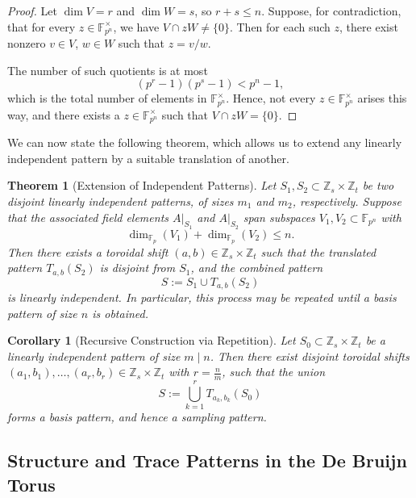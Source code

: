 \documentclass{article}
\newtheorem{theorem}{Theorem}[section]
\newtheorem{corollary}{Corollary}[section]
\begin{document}
\begin{proof}
Let \( \dim V = r \) and \( \dim W = s \), so \( r + s \leq n \). Suppose, for contradiction, that for every \( z \in \mathbb{F}_{p^n}^\times \), we have \( V \cap zW \ne \{0\} \). Then for each such \( z \), there exist nonzero \( v \in V \), \( w \in W \) such that \( z = v/w \).

The number of such quotients is at most
\[
(p^r - 1)(p^s - 1) < p^n - 1,
\]
which is the total number of elements in \( \mathbb{F}_{p^n}^\times \). Hence, not every \( z \in \mathbb{F}_{p^n}^\times \) arises this way, and there exists a \( z \in \mathbb{F}_{p^n}^\times \) such that \( V \cap zW = \{0\} \).
\end{proof}

We can now state the following theorem, which allows us to extend any linearly independent pattern by a suitable translation of another.

\begin{theorem}[Extension of Independent Patterns]
Let \( S_1, S_2 \subset \mathbb{Z}_s \times \mathbb{Z}_t \) be two disjoint linearly independent patterns, of sizes \( m_1 \) and \( m_2 \), respectively. Suppose that the associated field elements \( A|_{S_1} \) and \( A|_{S_2} \) span subspaces \( V_1, V_2 \subset \mathbb{F}_{p^n} \) with
\[
\dim_{\mathbb{F}_p}(V_1) + \dim_{\mathbb{F}_p}(V_2) \le n.
\]
Then there exists a toroidal shift \( (a, b) \in \mathbb{Z}_s \times \mathbb{Z}_t \) such that the translated pattern \( T_{a,b}(S_2) \) is disjoint from \( S_1 \), and the combined pattern
\[
S := S_1 \cup T_{a,b}(S_2)
\]
is linearly independent. In particular, this process may be repeated until a basis pattern of size \( n \) is obtained.
\end{theorem}

\begin{corollary}[Recursive Construction via Repetition]
Let \( S_0 \subset \mathbb{Z}_s \times \mathbb{Z}_t \) be a linearly independent pattern of size \( m \mid n \). Then there exist disjoint toroidal shifts \( (a_1, b_1), \dots, (a_r, b_r) \in \mathbb{Z}_s \times \mathbb{Z}_t \) with \( r = \frac{n}{m} \), such that the union
\[
S := \bigcup_{k=1}^{r} T_{a_k, b_k}(S_0)
\]
forms a basis pattern, and hence a sampling pattern.
\end{corollary}

\subsection{Structure and Trace Patterns in the De Bruijn Torus}
\end{document}
